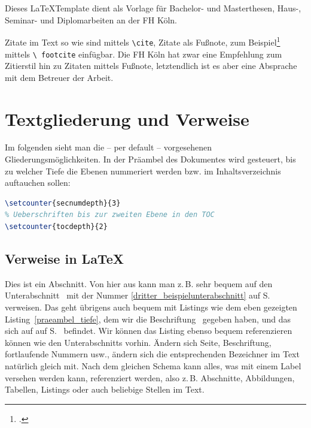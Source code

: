 \documentclass[12pt,oneside,a4paper,bibtotoc,liststotoc]{scrreprt}
\newcommand{\zB}{\mbox{z.\,B.}\xspace}
\begin{document}
Dieses \LaTeX Template dient als Vorlage für Bachelor- und
Masterthesen, Haus-, Seminar- und Diplomarbeiten an der \ac{FH} Köln.

Zitate im Text so wie \cite[vgl.][S.~1]{Lamport} sind mittels
\texttt{\textbackslash cite}, Zitate als Fußnote, zum
Beispiel\footcite[vgl.][S.~1]{Lamport} mittels \texttt{\textbackslash
  footcite} einfügbar. Die \ac{FH} Köln hat zwar eine Empfehlung zum
Zitierstil hin zu Zitaten mittels Fußnote, letztendlich ist es aber
eine Absprache mit dem Betreuer der Arbeit.

\chapter{Textgliederung und Verweise}

Im folgenden sieht man die -- per default -- vorgesehenen
Gliederungsmöglichkeiten. In der Präambel des Dokumentes wird
gesteuert, bis zu welcher Tiefe die Ebenen nummeriert werden bzw. im
Inhaltsverzeichnis auftauchen sollen:

\begin{lstlisting}[language=TeX,caption=Steuerung der
  Nummerierungstiefe und Inhaltsverzeichnistiefe in der
  Prämbel,label=praeambel_tiefe]
% Ueberschriften bis zur dritten Ebene durchnummerieren
\setcounter{secnumdepth}{3}
% Ueberschriften bis zur zweiten Ebene in den TOC
\setcounter{tocdepth}{2}
\end{lstlisting}

\section{Verweise in \LaTeX}

Dies ist ein Abschnitt. Von hier aus kann man \zB sehr bequem auf den
Unterabschnitt \glqq {}\grqq\
mit der Nummer \ref{dritter_beispielunterabschnitt} auf
S.~\pageref{dritter_beispielunterabschnitt} verweisen. Das geht
übrigens auch bequem mit Listings wie dem eben gezeigten
Listing~\ref{praeambel_tiefe}, dem wir die Beschriftung \glqq
{}\grqq\ gegeben haben, und das sich auf auf
S.~\pageref{praeambel_tiefe} befindet. Wir können das Listing ebenso
bequem referenzieren können wie den Unterabschnitts vorhin. Ändern
sich Seite, Beschriftung, fortlaufende Nummern usw., ändern sich die
entsprechenden Bezeichner im Text natürlich gleich mit. Nach dem
gleichen Schema kann alles, was mit einem Label versehen werden kann,
referenziert werden, also \zB Abschnitte, Abbildungen, Tabellen,
Listings oder auch beliebige Stellen im Text.
\end{document}
